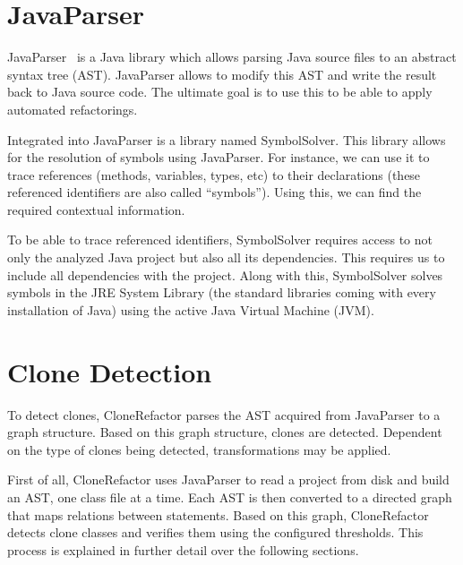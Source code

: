 \documentclass[conference]{IEEEtran}
\begin{document}
\section{JavaParser}
JavaParser~\cite{tomassetti2017javaparser} is a Java library which allows parsing Java source files to an abstract syntax tree (AST). JavaParser allows to modify this AST and write the result back to Java source code. The ultimate goal is to use this to be able to apply automated refactorings.

Integrated into JavaParser is a library named SymbolSolver. This library allows for the resolution of symbols using JavaParser. For instance, we can use it to trace references (methods, variables, types, etc) to their declarations (these referenced identifiers are also called ``symbols''). Using this, we can find the required contextual information.

To be able to trace referenced identifiers, SymbolSolver requires access to not only the analyzed Java project but also all its dependencies. This requires us to include all dependencies with the project. Along with this, SymbolSolver solves symbols in the JRE System Library (the standard libraries coming with every installation of Java) using the active Java Virtual Machine (JVM). %

\section{Clone Detection}\label{sec:clonedetection}
To detect clones, CloneRefactor parses the AST acquired from JavaParser to a graph structure. Based on this graph structure, clones are detected. Dependent on the type of clones being detected, transformations may be applied.

First of all, CloneRefactor uses JavaParser to read a project from disk and build an AST, one class file at a time. Each AST is then converted to a directed graph that maps relations between statements. Based on this graph, CloneRefactor detects clone classes and verifies them using the configured thresholds. This process is explained in further detail over the following sections.
\end{document}

